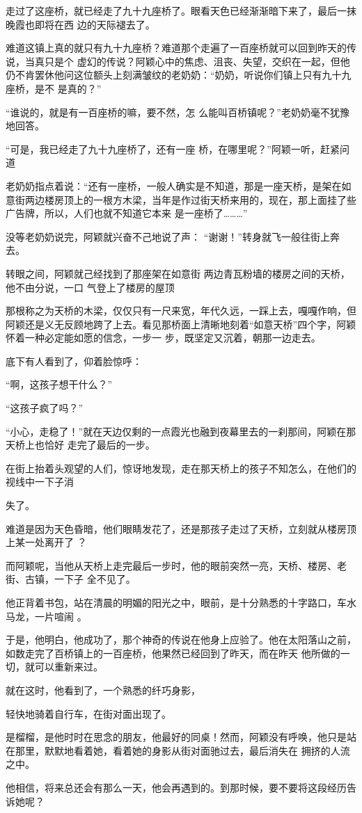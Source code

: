 \documentclass{article}
\begin{document}
走过了这座桥，就已经走了九十九座桥了。眼看天色已经渐渐暗下来了，最后一抹晚霞也即将在西
边的天际褪去了。 

难道这镇上真的就只有九十九座桥？难道那个走遍了一百座桥就可以回到昨天的传说，当真只是个
\newpage
虚幻的传说？阿颖心中的焦虑、沮丧、失望，交织在一起，但他仍不肯罢休他问这位额头上刻满皱纹的老奶奶：“奶奶，听说你们镇上只有九十九座桥，是不
是真的？” 

“谁说的，就是有一百座桥的嘛，要不然，怎
么能叫百桥镇呢？”老奶奶毫不犹豫地回答。 

“可是，我已经走了九十九座桥了，还有一座
桥，在哪里呢？”阿颖一听，赶紧问道 

老奶奶指点着说：“还有一座桥，一般人确实是不知道，那是一座天桥，是架在如意街两边楼房顶上的一根方木梁，当年是作过街天桥来用的，现在，那上面挂了些广告牌，所以，人们也就不知道它本来
是一座桥了………” 

没等老奶奶说完，阿颖就兴奋不己地说了声：
“谢谢！”转身就飞一般往街上奔去。 

转眼之间，阿颖就己经找到了那座架在如意街
\newpage
两边青瓦粉墙的楼房之间的天桥，他不由分说，一口
气登上了楼房的屋顶 

那根称之为天桥的木梁，仅仅只有一尺来宽，年代久远，一踩上去，嘎嘎作响，但阿颖还是义无反顾地跨了上去。看见那桥面上清晰地刻着“如意天桥”四个字，阿颖怀着一种必定能如愿的信念，一步一
步，既坚定又沉着，朝那一边走去。 


底下有人看到了，仰着脸惊呼： 


“啊，这孩子想干什么？” 


“这孩子疯了吗？” 

“小心，走稳了！”就在天边仅剩的一点霞光也融到夜幕里去的一刹那间，阿颖在那天桥上也恰好
走完了最后的一步。 

在街上抬着头观望的人们，惊讶地发现，走在那天桥上的孩子不知怎么，在他们的视线中一下子消
\newpage

失了。 

难道是因为天色昏暗，他们眼睛发花了，还是那孩子走过了天桥，立刻就从楼房顶上某一处离开了
？ 

而阿颖呢，当他从天桥上走完最后一步时，他的眼前突然一亮，天桥、楼房、老街、古镇，一下子
全不见了。 

他正背着书包，站在清晨的明媚的阳光之中，眼前，是十分熟悉的十字路口，车水马龙，一片喧闹
。 

于是，他明白，他成功了，那个神奇的传说在他身上应验了。他在太阳落山之前，如数走完了百桥镇上的一百座桥，他果然已经回到了昨天，而在昨天
他所做的一切，就可以重新来过。 

就在这时，他看到了，一个熟悉的纤巧身影，

\newpage
轻快地骑着自行车，在街对面出现了。 

是榴榴，是他时时在思念的朋友，他最好的同桌！然而，阿颖没有呼唤，他只是站在那里，默默地看着她，看着她的身影从街对面驰过去，最后消失在
拥挤的人流之中。 

他相信，将来总还会有那么一天，他会再遇到的。到那时候，要不要将这段经历告诉她呢？
\end{document}
